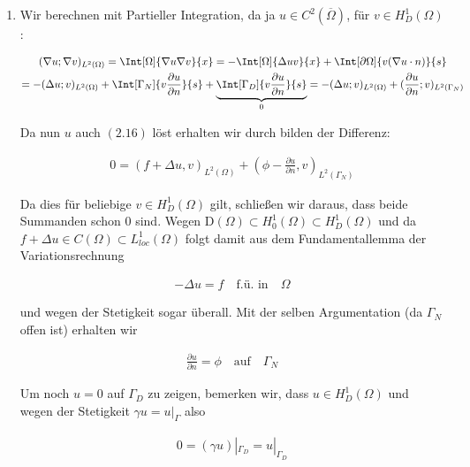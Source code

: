 \begin{solution}
\begin{enumerate}[label = (\roman*)]
    \item Wir berechnen mit Partieller Integration, da ja $u \in C^2(\overline{\Omega})$, für $v \in H_D^1(\Omega)$:

    \begin{multline*}
      (\nabla u; \nabla v)_{L^2(\Omega)}
      =
      \Int[\Omega]{\nabla u \nabla v}{x}
      =
      -\Int[\Omega]{\Delta u v}{x} + \Int[\partial \Omega]{v(\nabla u \cdot n)}{s} \\
      =
      -(\Delta u; v)_{L^2(\Omega)}
      + \Int[\Gamma_N]{v \frac{\partial u}{\partial n}}{s}
      + \underbrace{\Int[\Gamma_D]{v \frac{\partial u}{\partial n}}{s}}_{0}
      =
      -(\Delta u; v)_{L^2(\Omega)} + (\frac{\partial u}{\partial n}; v)_{L^2(\Gamma_N)}
    \end{multline*}

    Da nun $u$ auch $(2.16)$ löst erhalten wir durch bilden der Differenz:

    \begin{align*}
      0 = (f + \Delta u, v)_{L^2(\Omega)} + (\phi - \frac{\partial u}{\partial n}, v)_{L^2(\Gamma_N)}
    \end{align*}

    Da dies für beliebige $v \in H_D^1(\Omega)$ gilt, schließen wir daraus, dass beide Summanden schon $0$ sind.
    Wegen $\mathrm{D}(\Omega) \subset H^1_0(\Omega) \subset H^1_D(\Omega)$ und da $f + \Delta u \in C(\Omega) \subset L^1_{loc}(\Omega)$ folgt damit aus dem Fundamentallemma der Variationsrechnung

    \begin{align*}
        -\Delta u = f \quad \text {f.ü. in} \quad \Omega
    \end{align*}

    und wegen der Stetigkeit sogar überall.
    Mit der selben Argumentation (da $\Gamma_N$ offen ist) erhalten wir

    \begin{align*}
      \frac{\partial u}{\partial n} = \phi \quad \text{auf} \quad \Gamma_N
    \end{align*}

    Um noch $u = 0$ auf $\Gamma_D$ zu zeigen, bemerken wir, dass $u \in H^1_D(\Omega)$ und wegen der Stetigkeit $\gamma u = u|_{\Gamma}$ also

    \begin{align*}
      0 = (\gamma u)|_{\Gamma_D} = u|_{\Gamma_D}
    \end{align*}
\end{enumerate}

\end{solution}

